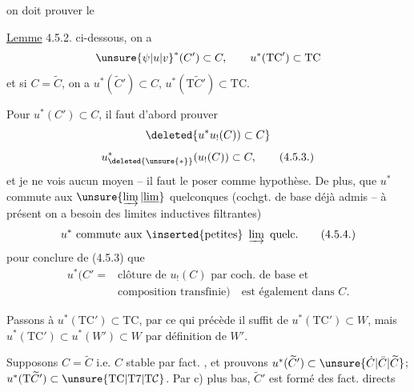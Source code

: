
on doit prouver le

\margin{$\vert$}\uline{Lemme} 4.5.2.   ci-dessous, on a
\[
\unsure{\psi|u|v}^*(C')\subset C,\qquad u^*(\mathrm{TC}')\subset\mathrm{TC}
\]
\margin{$\vert$}et si $C=\widetilde C$, on a $u^*(\widetilde C')\subset C$, $u^*(\mathrm{T}\widetilde C')\subset\mathrm{TC}$.


Pour $u^*(C')\subset C$, il faut d'abord prouver
\[
\deleted{u^*u_!(C))\subset C}
\]
\[
u_{\deleted{\unsure{*}}}^{*}(u_!(C))\subset C,\tag*{(4.5.3.)}
\]
et je ne vois aucun moyen -- il faut le poser comme hypothèse. De plus, que $u^*$ commute aux $\unsure{\varinjlim|\underline{\lim}}$ quelconques (cochgt. de base déjà  admis -- à présent on a besoin des limites inductives filtrantes)
\[
u^*\ \text{commute aux }\text{\inserted{petites}}\ \varinjlim\ \text{quelc.}\tag*{(4.5.4.)}
\]
pour conclure de (4.5.3) que
\[
\begin{aligned}
u^*(C'={}&\text{clôture de }u_!(C)\text{ par coch. de base et}\\ &\text{composition transfinie})\quad\text{est également dans }C.
\end{aligned}
\]

Passons à $u^*(\mathrm{TC}')\subset\mathrm{TC}$, par ce qui précède  il suffit de  $u^*(\mathrm{TC}')\subset W$, mais $u^*(\mathrm{TC}')\subset u^*(W')\subset W$ par définition de $W'$.

Supposons $C=\widetilde C$ i.e. $C$ stable par fact. , et prouvons $u^*(\widetilde C')\subset\unsure{\dot C|\bar C|\widetilde C}$; $u^*(\mathrm{T}\widetilde C')\subset\unsure{\mathrm{TC}|\mathrm{T}7|\mathrm{T}\mathcal C}$. Par c) plus bas, $\widetilde C'$ est formé des fact. directs
